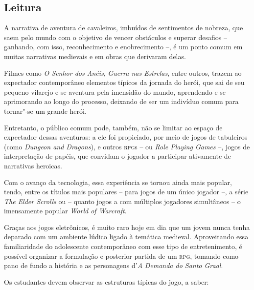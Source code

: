 \documentclass{extarticle}
\begin{document}
\subsection{Leitura}



A narrativa de aventura de cavaleiros, imbuídos de
sentimentos de nobreza, que saem pelo mundo com o objetivo de vencer
obstáculos e superar desafios -- ganhando, com isso, reconhecimento e
enobrecimento --, é um ponto comum em muitas narrativas medievais e em
obras que derivaram delas.

Filmes como \emph{O Senhor dos Anéis}, \emph{Guerra nas Estrelas}, entre
outros, trazem ao expectador contemporâneo elementos típicos da jornada
do herói, que sai de seu pequeno vilarejo e se aventura pela imensidão
do mundo, aprendendo e se aprimorando ao longo do processo, deixando de
ser um indivíduo comum para tornar"-se um grande herói.

Entretanto, o público comum pode, também, não se limitar ao espaço de
expectador dessas aventuras: a ele foi propiciado, por meio de jogos de
tabuleiros (como \emph{Dungeon and Dragons}), e outros \textsc{rpg}s -- ou
\emph{Role Playing Games} --, jogos de interpretação de papéis, que
convidam o jogador a participar ativamente de narrativas heroicas.

Com o avanço da tecnologia, essa experiência se tornou ainda mais
popular, tendo, entre os títulos mais populares -- para jogos de um
único jogador --, a série \emph{The Elder Scrolls} ou -- quanto jogos a
com múltiplos jogadores simultâneos -- o imensamente popular \emph{World
of Warcraft}.

Graças aos jogos eletrônicos, é muito raro hoje em dia que um jovem
nunca tenha deparado com um ambiente lúdico ligado à temática medieval.
Aproveitando essa familiaridade do adolescente contemporâneo com esse
tipo de entretenimento, é possível organizar a formulação e posterior
partida de um \textsc{rpg}, tomando como pano de fundo a história e as
personagens d'\emph{A} \emph{Demanda do Santo Graal}.

Os estudantes devem observar as estruturas típicas do jogo, a saber:
\end{document}
